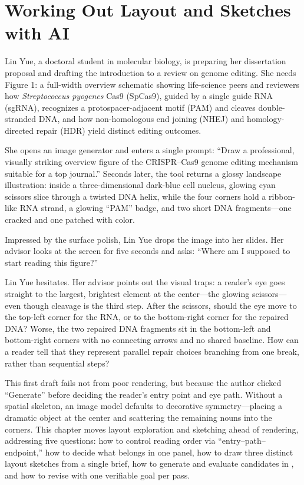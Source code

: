\chapter{Working Out Layout and Sketches with AI}
\usetikzlibrary{decorations.pathreplacing}

Lin Yue, a doctoral student in molecular biology, is preparing her dissertation proposal and drafting the introduction to a review on genome editing. She needs Figure 1: a full-width overview schematic showing life-science peers and reviewers how \emph{Streptococcus pyogenes} Cas9 (SpCas9), guided by a single guide RNA (sgRNA), recognizes a protospacer-adjacent motif (PAM) and cleaves double-stranded DNA, and how non-homologous end joining (NHEJ) and homology-directed repair (HDR) yield distinct editing outcomes.

She opens an image generator and enters a single prompt: ``Draw a professional, visually striking overview figure of the CRISPR--Cas9 genome editing mechanism suitable for a top journal.'' Seconds later, the tool returns a glossy landscape illustration: inside a three-dimensional dark-blue cell nucleus, glowing cyan scissors slice through a twisted DNA helix, while the four corners hold a ribbon-like RNA strand, a glowing ``PAM'' badge, and two short DNA fragments—one cracked and one patched with color.

Impressed by the surface polish, Lin Yue drops the image into her slides. Her advisor looks at the screen for five seconds and asks: ``Where am I supposed to start reading this figure?''

Lin Yue hesitates. Her advisor points out the visual traps: a reader's eye goes straight to the largest, brightest element at the center—the glowing scissors—even though cleavage is the third step. After the scissors, should the eye move to the top-left corner for the RNA, or to the bottom-right corner for the repaired DNA? Worse, the two repaired DNA fragments sit in the bottom-left and bottom-right corners with no connecting arrows and no shared baseline. How can a reader tell that they represent parallel repair choices branching from one break, rather than sequential steps?

This first draft fails not from poor rendering, but because the author clicked ``Generate'' before deciding the reader's entry point and eye path. Without a spatial skeleton, an image model defaults to decorative symmetry—placing a dramatic object at the center and scattering the remaining nouns into the corners. This chapter moves layout exploration and sketching ahead of rendering, addressing five questions: how to control reading order via ``entry--path--endpoint,'' how to decide what belongs in one panel, how to draw three distinct layout sketches from a single brief, how to generate and evaluate candidates in \scidraw{}, and how to revise with one verifiable goal per pass.

